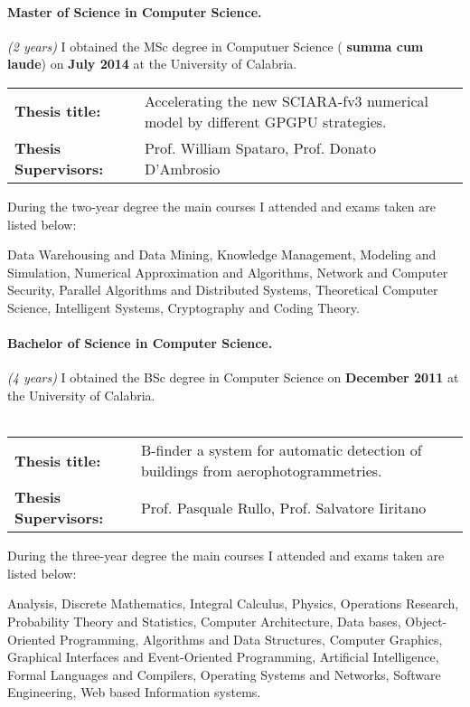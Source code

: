 \documentclass[a4paper,10pt]{article}
\begin{document}
\paragraph{Master of Science in Computer Science.} \textit{(2 years)}
I obtained the MSc degree in Computuer Science ( \textbf{summa cum laude}) on
\textbf{July 2014} at the University of Calabria.\\
{\centering
\begin{tabular}{l l}
\textbf{Thesis title:}& \textsf{Accelerating the new SCIARA-fv3 numerical model
by different GPGPU strategies.}\\
\textbf{Thesis Supervisors:} & Prof. William Spataro, Prof. Donato D'Ambrosio\\
\end{tabular}
}

\noindent During the two-year degree the main courses I attended and exams taken are listed below: 

\noindent Data Warehousing and Data Mining, Knowledge Management, Modeling and Simulation, Numerical Approximation and Algorithms, 
Network and Computer Security, Parallel Algorithms and Distributed Systems, Theoretical Computer Science, Intelligent Systems, 
Cryptography and Coding Theory.


\paragraph{Bachelor of Science in Computer Science.}\textit{(4 years)}
I obtained the BSc degree in Computer Science on \textbf{December 2011} at the
University of Calabria.\\ \hfill\\
{\centering
\begin{tabular}{l l}
\textbf{Thesis title:}& \textsf{B-finder a system for automatic detection of
buildings from aerophotogrammetries.} \\
\textbf{Thesis Supervisors:} & Prof. Pasquale Rullo, Prof. Salvatore Iiritano\\
\end{tabular}
}
\noindent During the three-year degree the main courses I attended and exams taken are listed below:

\noindent Analysis, Discrete Mathematics, Integral Calculus, Physics,
 Operations Research, Probability Theory and Statistics, Computer Architecture,
 Data bases, Object-Oriented Programming, Algorithms and Data Structures,
 Computer Graphics, Graphical Interfaces and Event-Oriented Programming,
 Artificial Intelligence, Formal Languages and Compilers, Operating Systems and
 Networks, Software Engineering, Web based Information systems.
\end{document}
